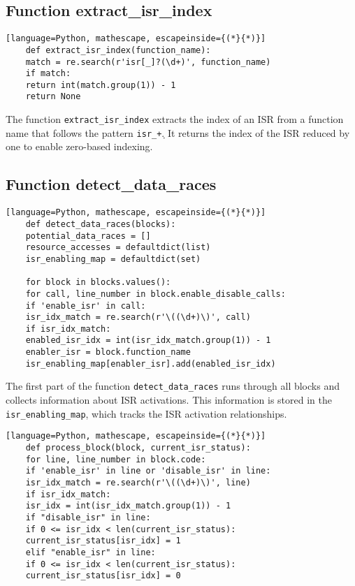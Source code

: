 \documentclass[
fancyheadings, %
%
%
]{stsreprt}
\begin{document}
{\subsection*{Function extract\_isr\_index}

\begin{lstlisting}[language=Python, mathescape, escapeinside={(*}{*)}]
	def extract_isr_index(function_name):
	match = re.search(r'isr[_]?(\d+)', function_name)
	if match:
	return int(match.group(1)) - 1
	return None
\end{lstlisting}

The function \texttt{extract\_isr\_index} extracts the index of an ISR from a function name that follows the pattern \texttt{isr\_\d+}. It returns the index of the ISR reduced by one to enable zero-based indexing.

\subsection*{Function detect\_data\_races}

\begin{lstlisting}[language=Python, mathescape, escapeinside={(*}{*)}]
	def detect_data_races(blocks):
	potential_data_races = []
	resource_accesses = defaultdict(list)
	isr_enabling_map = defaultdict(set)
	
	for block in blocks.values():
	for call, line_number in block.enable_disable_calls:
	if 'enable_isr' in call:
	isr_idx_match = re.search(r'\((\d+)\)', call)
	if isr_idx_match:
	enabled_isr_idx = int(isr_idx_match.group(1)) - 1
	enabler_isr = block.function_name
	isr_enabling_map[enabler_isr].add(enabled_isr_idx)
\end{lstlisting}

The first part of the function \texttt{detect\_data\_races} runs through all blocks and collects information about ISR activations. This information is stored in the \texttt{isr\_enabling\_map}, which tracks the ISR activation relationships.

\begin{lstlisting}[language=Python, mathescape, escapeinside={(*}{*)}]
	def process_block(block, current_isr_status):
	for line, line_number in block.code:
	if 'enable_isr' in line or 'disable_isr' in line:
	isr_idx_match = re.search(r'\((\d+)\)', line)
	if isr_idx_match:
	isr_idx = int(isr_idx_match.group(1)) - 1  
	if "disable_isr" in line:
	if 0 <= isr_idx < len(current_isr_status):
	current_isr_status[isr_idx] = 1
	elif "enable_isr" in line:
	if 0 <= isr_idx < len(current_isr_status):
	current_isr_status[isr_idx] = 0
	

\end{lstlisting}}
\end{document}

